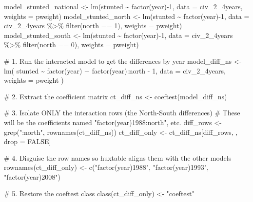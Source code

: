\documentclass[
  letterpaper,
  DIV=11,
  numbers=noendperiod]{scrartcl}
\newenvironment{Shaded}{\begin{snugshade}}{\end{snugshade}}
\newcommand{\AttributeTok}[1]{\textcolor[rgb]{0.40,0.45,0.13}{#1}}
\newcommand{\CommentTok}[1]{\textcolor[rgb]{0.37,0.37,0.37}{#1}}
\newcommand{\ConstantTok}[1]{\textcolor[rgb]{0.56,0.35,0.01}{#1}}
\newcommand{\DecValTok}[1]{\textcolor[rgb]{0.68,0.00,0.00}{#1}}
\newcommand{\FunctionTok}[1]{\textcolor[rgb]{0.28,0.35,0.67}{#1}}
\newcommand{\NormalTok}[1]{\textcolor[rgb]{0.00,0.23,0.31}{#1}}
\newcommand{\OtherTok}[1]{\textcolor[rgb]{0.00,0.23,0.31}{#1}}
\newcommand{\SpecialCharTok}[1]{\textcolor[rgb]{0.37,0.37,0.37}{#1}}
\newcommand{\StringTok}[1]{\textcolor[rgb]{0.13,0.47,0.30}{#1}}
\begin{document}
\begin{Shaded}
\begin{Highlighting}[]
\NormalTok{model\_stunted\_national }\OtherTok{\textless{}{-}} \FunctionTok{lm}\NormalTok{(stunted }\SpecialCharTok{\textasciitilde{}} \FunctionTok{factor}\NormalTok{(year)}\SpecialCharTok{{-}}\DecValTok{1}\NormalTok{, }\AttributeTok{data =}\NormalTok{ civ\_2\_4years, }\AttributeTok{weights =}\NormalTok{ pweight)}
\NormalTok{model\_stunted\_north }\OtherTok{\textless{}{-}} \FunctionTok{lm}\NormalTok{(stunted }\SpecialCharTok{\textasciitilde{}} \FunctionTok{factor}\NormalTok{(year)}\SpecialCharTok{{-}}\DecValTok{1}\NormalTok{, }\AttributeTok{data =}\NormalTok{ civ\_2\_4years }\SpecialCharTok{\%\textgreater{}\%} \FunctionTok{filter}\NormalTok{(north }\SpecialCharTok{==} \DecValTok{1}\NormalTok{), }\AttributeTok{weights =}\NormalTok{ pweight)}
\NormalTok{model\_stunted\_south }\OtherTok{\textless{}{-}} \FunctionTok{lm}\NormalTok{(stunted }\SpecialCharTok{\textasciitilde{}} \FunctionTok{factor}\NormalTok{(year)}\SpecialCharTok{{-}}\DecValTok{1}\NormalTok{, }\AttributeTok{data =}\NormalTok{ civ\_2\_4years }\SpecialCharTok{\%\textgreater{}\%} \FunctionTok{filter}\NormalTok{(north }\SpecialCharTok{==} \DecValTok{0}\NormalTok{), }\AttributeTok{weights =}\NormalTok{ pweight)}

\CommentTok{\# 1. Run the interacted model to get the differences by year}
\NormalTok{model\_diff\_ns }\OtherTok{\textless{}{-}} \FunctionTok{lm}\NormalTok{(}
\NormalTok{  stunted }\SpecialCharTok{\textasciitilde{}} \FunctionTok{factor}\NormalTok{(year) }\SpecialCharTok{+} \FunctionTok{factor}\NormalTok{(year)}\SpecialCharTok{:}\NormalTok{north }\SpecialCharTok{{-}} \DecValTok{1}\NormalTok{, }
  \AttributeTok{data =}\NormalTok{ civ\_2\_4years, }
  \AttributeTok{weights =}\NormalTok{ pweight}
\NormalTok{)}

\CommentTok{\# 2. Extract the coefficient matrix}
\NormalTok{ct\_diff\_ns }\OtherTok{\textless{}{-}} \FunctionTok{coeftest}\NormalTok{(model\_diff\_ns)}

\CommentTok{\# 3. Isolate ONLY the interaction rows (the North{-}South differences)}
\CommentTok{\# These will be the coefficients named "factor(year)1988:north", etc.}
\NormalTok{diff\_rows }\OtherTok{\textless{}{-}} \FunctionTok{grep}\NormalTok{(}\StringTok{":north"}\NormalTok{, }\FunctionTok{rownames}\NormalTok{(ct\_diff\_ns))}
\NormalTok{ct\_diff\_only }\OtherTok{\textless{}{-}}\NormalTok{ ct\_diff\_ns[diff\_rows, , drop }\OtherTok{=} \ConstantTok{FALSE}\NormalTok{]}

\CommentTok{\# 4. Disguise the row names so huxtable aligns them with the other models}
\FunctionTok{rownames}\NormalTok{(ct\_diff\_only) }\OtherTok{\textless{}{-}} \FunctionTok{c}\NormalTok{(}\StringTok{"factor(year)1988"}\NormalTok{, }\StringTok{"factor(year)1993"}\NormalTok{, }\StringTok{"factor(year)2008"}\NormalTok{)}

\CommentTok{\# 5. Restore the coeftest class}
\FunctionTok{class}\NormalTok{(ct\_diff\_only) }\OtherTok{\textless{}{-}} \StringTok{"coeftest"}
\end{Highlighting}
\end{Shaded}
\end{document}
